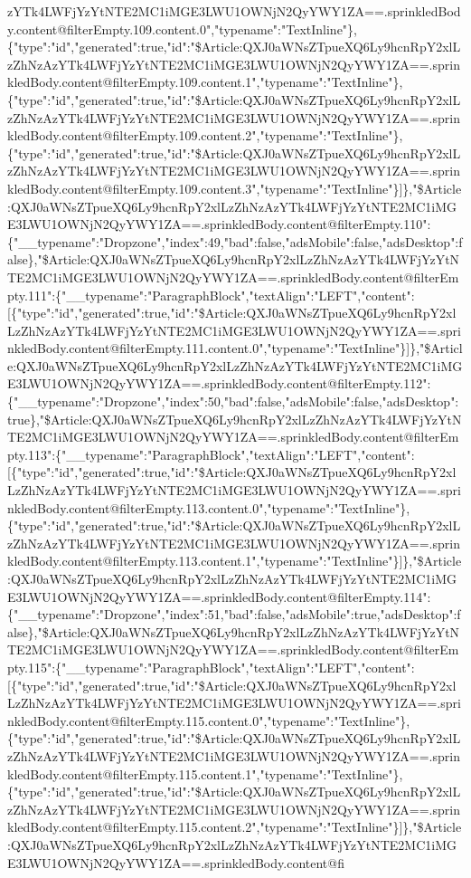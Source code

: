 zYTk4LWFjYzYtNTE2MC1iMGE3LWU1OWNjN2QyYWY1ZA==.sprinkledBody.content@filterEmpty.109.content.0","typename":"TextInline"\},\{"type":"id","generated":true,"id":"\$Article:QXJ0aWNsZTpueXQ6Ly9hcnRpY2xlLzZhNzAzYTk4LWFjYzYtNTE2MC1iMGE3LWU1OWNjN2QyYWY1ZA==.sprinkledBody.content@filterEmpty.109.content.1","typename":"TextInline"\},\{"type":"id","generated":true,"id":"\$Article:QXJ0aWNsZTpueXQ6Ly9hcnRpY2xlLzZhNzAzYTk4LWFjYzYtNTE2MC1iMGE3LWU1OWNjN2QyYWY1ZA==.sprinkledBody.content@filterEmpty.109.content.2","typename":"TextInline"\},\{"type":"id","generated":true,"id":"\$Article:QXJ0aWNsZTpueXQ6Ly9hcnRpY2xlLzZhNzAzYTk4LWFjYzYtNTE2MC1iMGE3LWU1OWNjN2QyYWY1ZA==.sprinkledBody.content@filterEmpty.109.content.3","typename":"TextInline"\}{]}\},"\$Article:QXJ0aWNsZTpueXQ6Ly9hcnRpY2xlLzZhNzAzYTk4LWFjYzYtNTE2MC1iMGE3LWU1OWNjN2QyYWY1ZA==.sprinkledBody.content@filterEmpty.110":\{"\_\_typename":"Dropzone","index":49,"bad":false,"adsMobile":false,"adsDesktop":false\},"\$Article:QXJ0aWNsZTpueXQ6Ly9hcnRpY2xlLzZhNzAzYTk4LWFjYzYtNTE2MC1iMGE3LWU1OWNjN2QyYWY1ZA==.sprinkledBody.content@filterEmpty.111":\{"\_\_typename":"ParagraphBlock","textAlign":"LEFT","content":{[}\{"type":"id","generated":true,"id":"\$Article:QXJ0aWNsZTpueXQ6Ly9hcnRpY2xlLzZhNzAzYTk4LWFjYzYtNTE2MC1iMGE3LWU1OWNjN2QyYWY1ZA==.sprinkledBody.content@filterEmpty.111.content.0","typename":"TextInline"\}{]}\},"\$Article:QXJ0aWNsZTpueXQ6Ly9hcnRpY2xlLzZhNzAzYTk4LWFjYzYtNTE2MC1iMGE3LWU1OWNjN2QyYWY1ZA==.sprinkledBody.content@filterEmpty.112":\{"\_\_typename":"Dropzone","index":50,"bad":false,"adsMobile":false,"adsDesktop":true\},"\$Article:QXJ0aWNsZTpueXQ6Ly9hcnRpY2xlLzZhNzAzYTk4LWFjYzYtNTE2MC1iMGE3LWU1OWNjN2QyYWY1ZA==.sprinkledBody.content@filterEmpty.113":\{"\_\_typename":"ParagraphBlock","textAlign":"LEFT","content":{[}\{"type":"id","generated":true,"id":"\$Article:QXJ0aWNsZTpueXQ6Ly9hcnRpY2xlLzZhNzAzYTk4LWFjYzYtNTE2MC1iMGE3LWU1OWNjN2QyYWY1ZA==.sprinkledBody.content@filterEmpty.113.content.0","typename":"TextInline"\},\{"type":"id","generated":true,"id":"\$Article:QXJ0aWNsZTpueXQ6Ly9hcnRpY2xlLzZhNzAzYTk4LWFjYzYtNTE2MC1iMGE3LWU1OWNjN2QyYWY1ZA==.sprinkledBody.content@filterEmpty.113.content.1","typename":"TextInline"\}{]}\},"\$Article:QXJ0aWNsZTpueXQ6Ly9hcnRpY2xlLzZhNzAzYTk4LWFjYzYtNTE2MC1iMGE3LWU1OWNjN2QyYWY1ZA==.sprinkledBody.content@filterEmpty.114":\{"\_\_typename":"Dropzone","index":51,"bad":false,"adsMobile":true,"adsDesktop":false\},"\$Article:QXJ0aWNsZTpueXQ6Ly9hcnRpY2xlLzZhNzAzYTk4LWFjYzYtNTE2MC1iMGE3LWU1OWNjN2QyYWY1ZA==.sprinkledBody.content@filterEmpty.115":\{"\_\_typename":"ParagraphBlock","textAlign":"LEFT","content":{[}\{"type":"id","generated":true,"id":"\$Article:QXJ0aWNsZTpueXQ6Ly9hcnRpY2xlLzZhNzAzYTk4LWFjYzYtNTE2MC1iMGE3LWU1OWNjN2QyYWY1ZA==.sprinkledBody.content@filterEmpty.115.content.0","typename":"TextInline"\},\{"type":"id","generated":true,"id":"\$Article:QXJ0aWNsZTpueXQ6Ly9hcnRpY2xlLzZhNzAzYTk4LWFjYzYtNTE2MC1iMGE3LWU1OWNjN2QyYWY1ZA==.sprinkledBody.content@filterEmpty.115.content.1","typename":"TextInline"\},\{"type":"id","generated":true,"id":"\$Article:QXJ0aWNsZTpueXQ6Ly9hcnRpY2xlLzZhNzAzYTk4LWFjYzYtNTE2MC1iMGE3LWU1OWNjN2QyYWY1ZA==.sprinkledBody.content@filterEmpty.115.content.2","typename":"TextInline"\}{]}\},"\$Article:QXJ0aWNsZTpueXQ6Ly9hcnRpY2xlLzZhNzAzYTk4LWFjYzYtNTE2MC1iMGE3LWU1OWNjN2QyYWY1ZA==.sprinkledBody.content@fi